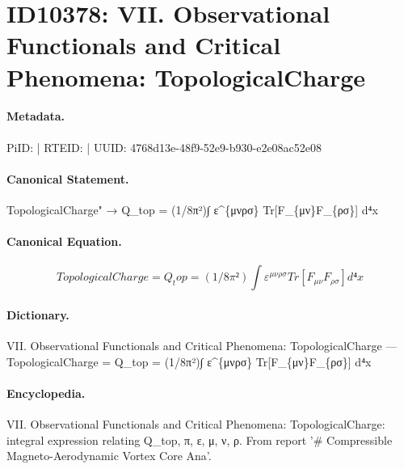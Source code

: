 \section*{ID10378: VII. Observational Functionals and Critical Phenomena: TopologicalCharge}
\paragraph{Metadata.}
PiID:  | RTEID:  | UUID: 4768d13e-48f9-52e9-b930-e2e08ac52e08

\paragraph{Canonical Statement.}
TopologicalCharge" → Q\_top = (1/8π²)∫ ε\textasciicircum{}\{μνρσ\} Tr[F\_\{μν\}F\_\{ρσ\}] d⁴x

\paragraph{Canonical Equation.}
\[
TopologicalCharge = Q_top = (1/8π²)∫ ε^{μνρσ} Tr[F_{μν}F_{ρσ}] d⁴x
\]

\paragraph{Dictionary.}
VII. Observational Functionals and Critical Phenomena: TopologicalCharge — TopologicalCharge = Q\_top = (1/8π²)∫ ε\textasciicircum{}\{μνρσ\} Tr[F\_\{μν\}F\_\{ρσ\}] d⁴x

\paragraph{Encyclopedia.}
VII. Observational Functionals and Critical Phenomena: TopologicalCharge: integral expression relating Q\_top, π, ε, μ, ν, ρ. From report '\# Compressible Magneto-Aerodynamic Vortex Core Ana'.
